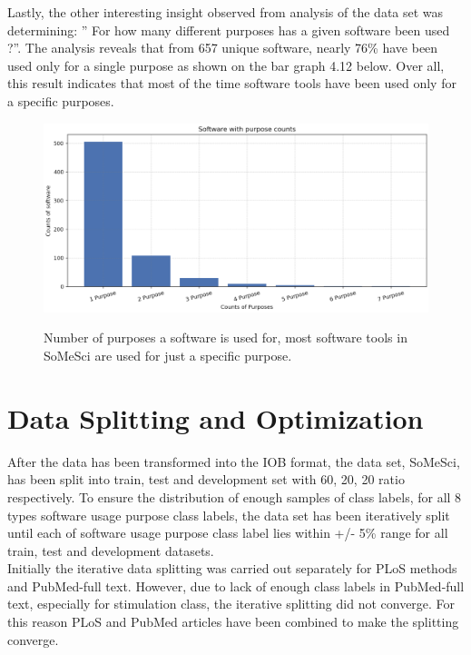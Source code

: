 Lastly, the other interesting insight observed from analysis of the data set was determining: ” For how many different purposes has a given software been used ?”.  The analysis reveals that from 657 unique software, nearly 76\% have been used only for a single purpose as shown on the bar graph 4.12 below. Over all, this result indicates that most of the time software tools have been used only for a specific purposes.


\begin{figure}[h]
	\centering
	\includegraphics[width=.85\linewidth]{4.graphics/figures/ch_4/analysisresults/7.counts of software purpose}
	\label{fig:chapter03:subfloat:grafik1}
	\caption{Number of purposes a software is used for, most software tools in SoMeSci are used for just a specific purpose.}
\end{figure}



\section{Data Splitting and Optimization}
\label{subsec:dataset:preprocessing:Splitting}
After the data has been transformed into the IOB format, the data set, \ac{SoMeSci}, has been split into train, test and development set with  60, 20, 20 ratio respectively. To ensure the distribution  of enough samples of class labels, for all 8 types software usage purpose class labels, the data set has been iteratively split until each of software usage purpose class label lies within +/- 5\%  range for all train, test and development datasets. \\ 

Initially the iterative data splitting was carried out separately for PLoS methods and PubMed-full text. However, due to lack of enough class labels in PubMed-full text, especially for stimulation class, the iterative splitting did not converge. For this reason PLoS and PubMed articles have been combined to make the splitting converge. \\

